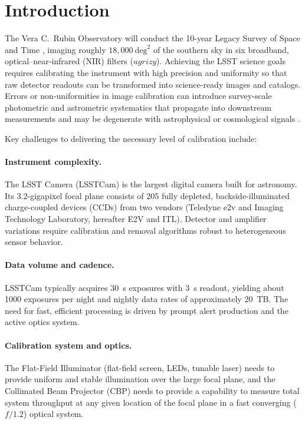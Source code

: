 \section{Introduction} \label{sec:intro}

The Vera C.\ Rubin Observatory will conduct the 10-year Legacy Survey of Space and Time \citep[LSST,][]{2019ApJ...873..111I}, imaging roughly $18{,}000~\mathrm{deg}^{2}$ of the southern sky in six broadband, optical--near-infrared (NIR) filters ($ugrizy$).
Achieving the LSST science goals \citep{LPM-17} requires calibrating the instrument with high precision and uniformity so that raw detector readouts can be transformed into science-ready images and catalogs.
Errors or non-uniformities in image calibration can introduce survey-scale photometric and astrometric systematics that propagate into downstream measurements and may be degenerate with astrophysical or cosmological signals \citep{2023PASP..135k5003E}.

Key challenges to delivering the necessary level of calibration include:
\paragraph{Instrument complexity.}
The LSST Camera (LSSTCam) is the largest digital camera built for astronomy.
Its 3.2-gigapixel focal plane consists of 205 fully depleted, backside-illuminated charge-coupled devices (CCDs) from two vendors (Teledyne e2v and Imaging Technology Laboratory, hereafter E2V and ITL).
Detector and amplifier variations require calibration and removal algorithms robust to heterogeneous sensor behavior.

\paragraph{Data volume and cadence.}
LSSTCam typically acquires 30~s exposures with 3~s readout, yielding about 1000 exposures per night and nightly data rates of approximately 20~TB.
The need for fast, efficient processing is driven by prompt alert production and the active optics system.

\paragraph{Calibration system and optics.}
The Flat-Field Illuminator (flat-field screen, LEDs, tunable laser) needs to provide uniform and stable illumination over the large focal plane, and the Collimated Beam Projector (CBP) needs to provide a capability to measure total system throughput at any given location of the focal plane in a fast converging ($f/1.2$) optical system.

